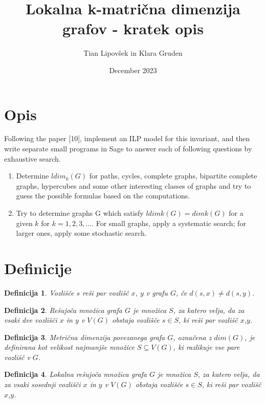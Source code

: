 \documentclass[a4paper,12pt]{article}
\newtheorem{definition}{Definicija}
\begin{document}
\author{Tian Lipovšek in Klara Gruden}
\date{December 2023}
\title{Lokalna k-matrična dimenzija grafov - kratek opis}
\maketitle


\section{Opis}
Following the paper [10], implement an ILP model for this invariant, and then write separate
small programs in Sage to answer each of following questions by exhaustive search.
\begin{enumerate}
    \item Determine $ldim_k(G)$ for paths, cycles, complete graphs, bipartite complete graphs, hypercubes and some 
    other interesting classes of graphs and try to guess the possible formulas based on the computations.
    \item Try to determine graphs G which satisfy $ldimk(G) = dimk(G)$ for a given $k$ for $k=1,2,3,...$.
    For small graphs, apply a systematic search; for larger ones, apply some stochastic search.
\end{enumerate}

\section{Definicije}

    \begin{definition}
        Vozlišče $s$ reši par vozlišč $x$, $y$ v grafu $G$, če $d(s,x) \neq d(s,y)$.
    \end{definition}

    \begin{definition}
        Rešujoča množica grafa $G$ je množica $S$, za katero velja, da za vsaki dve 
        vozlišči $x$ in $y$ v $V(G)$ obstaja vozlišče $s \in S$, ki reši par vozlišč $x$,$y$.
    \end{definition}

    \begin{definition}
        Metrična dimenzija povezanega grafa $G$, označena z $dim(G)$, je definirana kot velikost najmanjše 
        množice $S \subseteq V(G)$, ki razlikuje vse pare vozlišč v $G$.
    \end{definition}     

    \begin{definition}
        Lokalna rešujoča množica grafa $G$ je množica $S$, za katero velja, da za vsaki sosednji 
        vozlišči $x$ in $y$ v $V(G)$ obstaja vozlišče $s \in S$, ki reši par vozlišč $x$,$y$.
    \end{definition}
\end{document}
